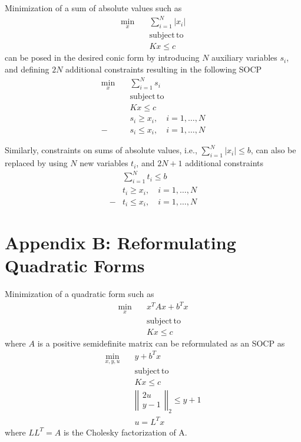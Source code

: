 \documentclass[letterpaper, preprint, paper,11pt]{AAS}	%
\begin{document}
	Minimization of a sum of absolute values such as 
	\begin{align}
	\min_x\quad &\sum^N_{i=1}|x_i| \\
		&\mathrm{subject\,to\,} \nonumber\\
		&Kx \le c 
	\end{align}
	can be posed in the desired conic form by introducing $N$ auxiliary variables $s_i$, and defining $2N$ additional constraints resulting in the following SOCP\cite{BoydConvexBook}
	\begin{align}
	\min_x\quad &\sum^N_{i=1}s_i \\
	&\mathrm{subject}\,\mathrm{to}\, \nonumber\\
	&Kx \le c \\
	&s_i \ge x_i , \quad i=1,\dots,N\\
	-&s_i \le x_i, \quad i=1,\dots,N 
	\end{align}
		
	Similarly, constraints on sums of absolute values, i.e., $\sum^N_{i=1}|x_i|\le b$, can also be replaced by using $N$ new variables $ t_i $, and $2N+1$ additional constraints 
	\begin{align}
	&\sum^N_{i=1} t_i \le b \\
	&t_i \ge x_i, \quad i=1,\dots,N\\
	-&t_i \le x_i ,\quad i=1,\dots,N
	\end{align}
	
	\section{Appendix B: Reformulating Quadratic Forms}
	Minimization of a quadratic form such as 
	\begin{align}
	\min_x\quad &x^TAx + b^Tx \\
		&\mathrm{subject\,to\,} \nonumber\\
		&Kx \le c 
	\end{align}
	where $A$ is a positive semidefinite matrix can be reformulated as an SOCP as\cite{BoydConvexBook}
	\begin{align}
	\min_{x,y,u}\quad &y + b^Tx \\
	&\mathrm{subject\,to\,} \nonumber\\
	&Kx \le c \\
	&\left|\left|\begin{array}{c}
	2u \\y-1
	\end{array}\right|\right|_2 \le y + 1 \\ %
	&u=L^Tx
	\end{align}
	where $LL^T=A$ is the Cholesky factorization of A.
	
		
		
		
	
		
		
\end{document}
